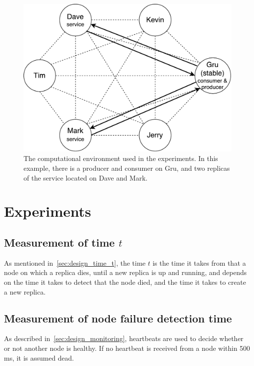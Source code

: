 \documentclass{cslthse-msc}
\begin{document}
\begin{figure}[!hbt]
\centering
\includegraphics[scale=0.5]{images/evaluation_application.pdf} 
\caption{The computational environment used in the experiments. In this example, there is a producer and consumer on Gru, and two replicas of the service located on Dave and Mark.} \label{fig:evaluation_application}
\end{figure}


\section{Experiments}

\subsection{Measurement of time $t$} \label{sec:eval_time_t}
As mentioned in~\cref{sec:design_time_t}, the time $t$ is the time it takes from that a node on which a replica dies, until a new replica is up and running, and depends on the time it takes to detect that the node died, and the time it takes to create a new replica.

\subsection{Measurement of node failure detection time} \label{subsec:eval_node_fail_time}
As described in~\cref{sec:design_monitoring}, heartbeats are used to decide whether or not another node is healthy. If no heartbeat is received from a node within 500 ms, it is assumed dead. 
\end{document}
